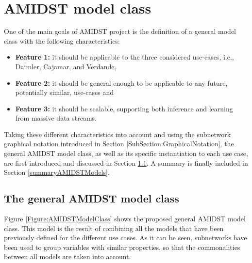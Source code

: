 \section{AMIDST model class}\label{section:AMIDSTmodelClass}

One of the main goals of AMIDST project is the definition of a general model class with the following characteristics: 

\begin{itemize}
\item \textbf{Feature 1:} it should be applicable to the three considered use-cases, i.e., Daimler, Cajamar, and Verdande,

\item \textbf{Feature 2:}  it should be general enough to be applicable to any future, potentially similar, use-cases and

\item \textbf{Feature 3:} it should be scalable, supporting both inference and learning from massive data streams.

\end{itemize}

Taking these different characteristics into account and using the subnetwork graphical notation introduced in Section \ref{SubSection:GraphicalNotation}, the general AMIDST model class, as well as its specific instantiation to each use case, are first introduced and discussed in Section \ref{GeneralModelClass}. A summary is finally included in Section \ref{summaryAMIDSTModels}.

\subsection{The general AMIDST model class}\label{GeneralModelClass}

Figure \ref{Figure:AMIDSTModelClass} shows the proposed general AMIDST model class. This model is the result of combining all the models that have been previously defined for the different use cases. As it can be seen, subnetworks have been used to group variables with similar properties, so that the commonalities between all models are taken into account. 

